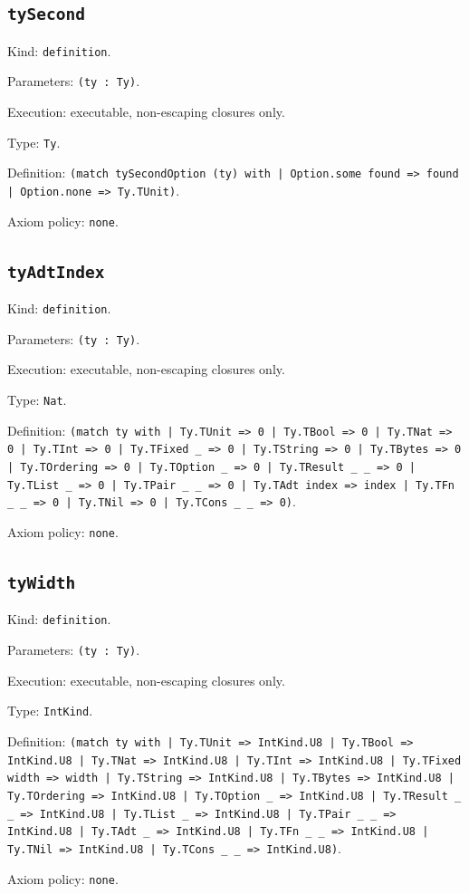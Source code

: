\documentclass[11pt]{article}
\begin{document}
\subsection*{\texttt{tySecond}}
\noindent Kind: \texttt{definition}.\par
\noindent Parameters: \texttt{(ty : Ty)}.\par
\noindent Execution: executable, non-escaping closures only.\par
\noindent Type: \texttt{Ty}.\par
\noindent Definition: \texttt{(match tySecondOption (ty) with | Option.some found => found | Option.none => Ty.TUnit)}.\par
\noindent Axiom policy: \texttt{none}.\par
\subsection*{\texttt{tyAdtIndex}}
\noindent Kind: \texttt{definition}.\par
\noindent Parameters: \texttt{(ty : Ty)}.\par
\noindent Execution: executable, non-escaping closures only.\par
\noindent Type: \texttt{Nat}.\par
\noindent Definition: \texttt{(match ty with | Ty.TUnit => 0 | Ty.TBool => 0 | Ty.TNat => 0 | Ty.TInt => 0 | Ty.TFixed \_ => 0 | Ty.TString => 0 | Ty.TBytes => 0 | Ty.TOrdering => 0 | Ty.TOption \_ => 0 | Ty.TResult \_ \_ => 0 | Ty.TList \_ => 0 | Ty.TPair \_ \_ => 0 | Ty.TAdt index => index | Ty.TFn \_ \_ => 0 | Ty.TNil => 0 | Ty.TCons \_ \_ => 0)}.\par
\noindent Axiom policy: \texttt{none}.\par
\subsection*{\texttt{tyWidth}}
\noindent Kind: \texttt{definition}.\par
\noindent Parameters: \texttt{(ty : Ty)}.\par
\noindent Execution: executable, non-escaping closures only.\par
\noindent Type: \texttt{IntKind}.\par
\noindent Definition: \texttt{(match ty with | Ty.TUnit => IntKind.U8 | Ty.TBool => IntKind.U8 | Ty.TNat => IntKind.U8 | Ty.TInt => IntKind.U8 | Ty.TFixed width => width | Ty.TString => IntKind.U8 | Ty.TBytes => IntKind.U8 | Ty.TOrdering => IntKind.U8 | Ty.TOption \_ => IntKind.U8 | Ty.TResult \_ \_ => IntKind.U8 | Ty.TList \_ => IntKind.U8 | Ty.TPair \_ \_ => IntKind.U8 | Ty.TAdt \_ => IntKind.U8 | Ty.TFn \_ \_ => IntKind.U8 | Ty.TNil => IntKind.U8 | Ty.TCons \_ \_ => IntKind.U8)}.\par
\noindent Axiom policy: \texttt{none}.\par
\end{document}
